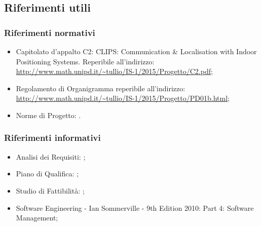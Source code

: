 \documentclass[../PianoProgetto.tex]{subfiles}
\begin{document}
	\subsection{Riferimenti utili}

		\subsubsection{Riferimenti normativi}
		\begin{itemize}
		\item Capitolato d’appalto C2: CLIPS: Communication \& Localisation with Indoor Positioning Systems. Reperibile all’indirizzo: \url{http://www.math.unipd.it/~tullio/IS-1/2015/Progetto/C2.pdf};
		\item Regolamento di Organigramma reperibile all’indirizzo: \url{http://www.math.unipd.it/~tullio/IS-1/2015/Progetto/PD01b.html};
		\item Norme di Progetto: \normediprogettov.
		\end{itemize}

		\subsubsection{Riferimenti informativi}
		\begin{itemize}
		\item Analisi dei Requisiti: ;
		\item Piano di Qualifica: ;
		\item Studio di Fattibilità: ;
		\item Software Engineering - Ian Sommerville - 9th Edition 2010:  Part 4: Software Management;
		\end{itemize}
			
\end{document}

